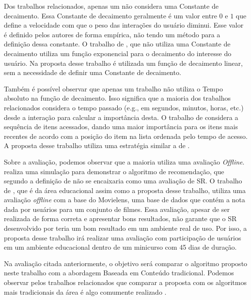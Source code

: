 Dos trabalhos relacionados, apenas um não considera uma Constante de decaimento. Essa Constante de decaimento geralmente
é um valor entre $0$ e $1$ que define a velocidade com que o peso das interações do usuário diminui. Esse valor é definido
pelos autores de forma empírica, não tendo um método para a definição dessa constante. O trabalho de ,
que não utiliza uma Constante de decaimento utiliza um função exponencial para o decaimento do interesse do usuário. Na
proposta desse trabalho é utilizada um função de decaimento linear, sem a necessidade de definir uma Constante de decaimento.

Também é possível observar que apenas um trabalho não utiliza o Tempo absoluto na função de decaimento. Isso significa que
a maioria dos trabalhos relacionados considera o tempo passado (e.g., em segundos, minutos, horas, etc.) desde a interação
para calcular a importância desta. O trabalho de  considera a sequência de itens acessados, dando
uma maior importância para os itens mais recentes de acordo com a posição do item na lista ordenada pelo tempo de acesso.
A proposta desse trabalho utiliza uma estratégia similar a de .

Sobre a avaliação, podemos observar que a maioria utiliza uma avaliação \textit{Offline}.  realiza
uma simulação para demonstrar o algoritmo de recomendação, que segundo a definição de  não
se encaixaria como uma avaliação de SR. O trabalho de , que é da área educacional assim como a
proposta desse trabalho, utiliza uma avaliação \textit{offline} com a base do Movielens, uma base de dados que contém a
nota dada por usuários para um conjunto de filmes. Essa avaliação, apesar de ser realizada de forma correta e apresentar
bons resultados, não garante que o SR desenvolvido por  teria um bom resultado em um ambiente
real de uso. Por isso, a proposta desse trabalho irá realizar uma avaliação com participação de usuários em um ambiente
educacional dentro de um minicurso com 45 dias de duração.

Na avaliação citada anteriormente, o objetivo será comparar o algoritmo proposto neste trabalho com a abordagem Baseada
em Conteúdo tradicional. Podemos observar pelos trabalhos relacionados que comparar a proposta com os algoritmos mais
tradicionais da área é algo comumente realizado \cite{fan2015modeling, luo2010context, hawalah2014utilizing, qiao2015personalized, wei2013web}.

